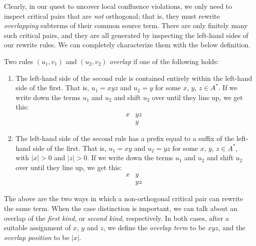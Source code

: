 \documentclass[../generics]{subfiles}
\begin{document}
Clearly, in our quest to uncover local confluence violations, we only need to inspect critical pairs that are \emph{not} orthogonal; that is, they must rewrite \emph{overlapping} subterms of their common source term. There are only finitely many such critical pairs, and they are all generated by inspecting the left-hand sides of our rewrite rules. We can completely characterize them with the below definition.
\begin{definition}\label{overlappingrules}
Two rules $(u_1, v_1)$ and $(u_2, v_2)$ \emph{overlap} if one of the following holds:
\begin{enumerate}
\item The left-hand side of the second rule is contained entirely within the left-hand side of the first. That is, $u_1=xyz$ and $u_2=y$ for some $x$, $y$, $z\in A^*$. If we write down the terms $u_1$ and $u_2$ and shift $u_2$ over until they line up, we get this:
\begin{align*}
x&yz\\
&y
\end{align*}
\item The left-hand side of the second rule has a prefix equal to a suffix of the left-hand side of the first. That is, $u_1=xy$ and $u_2=yz$ for some $x$, $y$, $z\in A^*$, with $|x|>0$ and $|z|>0$. If we write down the terms $u_1$ and $u_2$ and shift $u_2$ over until they line up, we get this:
\begin{align*}
x&y\\
&yz
\end{align*}
\end{enumerate}
The above are the two ways in which a non-orthogonal critical pair can rewrite the same term. When the case distinction is important, we can talk about an overlap of the \emph{first kind}, or \emph{second kind}, respectively. In both cases, after a suitable assignment of $x$, $y$ and $z$, we define the \emph{overlap term} to be $xyz$, and the \emph{overlap position} to be $|x|$.
\end{definition}
\end{document}
